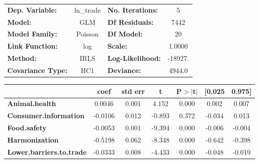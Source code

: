 \begin{center}
\begin{tabular}{lclc}
\toprule
\textbf{Dep. Variable:}                                            &   ln\_trade   & \textbf{  No. Iterations:    } &     5       \\
\textbf{Model:}                                                    &      GLM      & \textbf{  Df Residuals:      } &    7442     \\
\textbf{Model Family:}                                             &    Poisson    & \textbf{  Df Model:          } &     20      \\
\textbf{Link Function:}                                            &      log      & \textbf{  Scale:             } &    1.0000   \\
\textbf{Method:}                                                   &      IRLS     & \textbf{  Log-Likelihood:    } &   -18927.   \\
\textbf{Covariance Type:}                                          &      HC1      & \textbf{  Deviance:          } &    4944.0   \\
\bottomrule
\end{tabular}
\begin{tabular}{lcccccc}
                                                                   & \textbf{coef} & \textbf{std err} & \textbf{t} & \textbf{P$> |$t$|$} & \textbf{[0.025} & \textbf{0.975]}  \\
\midrule
\textbf{Animal.health}                                             &       0.0046  &        0.001     &     4.152  &         0.000        &        0.002    &        0.007     \\
\textbf{Consumer.information}                                      &      -0.0106  &        0.012     &    -0.893  &         0.372        &       -0.034    &        0.013     \\
\textbf{Food.safety}                                               &      -0.0053  &        0.001     &    -9.394  &         0.000        &       -0.006    &       -0.004     \\
\textbf{Harmonization}                                             &      -0.5198  &        0.062     &    -8.348  &         0.000        &       -0.642    &       -0.398     \\
\textbf{Lower.barriers.to.trade}                                   &      -0.0333  &        0.008     &    -4.433  &         0.000        &       -0.048    &       -0.019     \\

\end{tabular}
\end{center}
